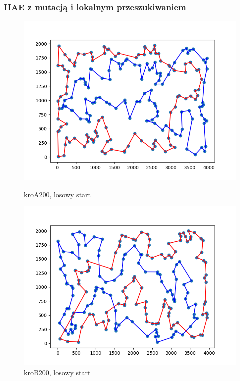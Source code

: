 \documentclass[11pt]{article}
\begin{document}
\subsubsection{HAE z mutacją i lokalnym przeszukiwaniem}

\begin{figure}[H]
    \begin{minipage}[t]{0.45\textwidth}
        \centering
        \includegraphics[width=\linewidth]{best_paths/kroA200/HAE+Mutation+LS}
        \caption{kroA200, losowy start}
    \end{minipage}
    \hfill
    \begin{minipage}[t]{0.45\textwidth}
        \centering
        \includegraphics[width=\linewidth]{best_paths/kroB200/HAE+Mutation+LS}
        \caption{kroB200, losowy start}
    \end{minipage}\label{fig:figure8}
\end{figure}
\end{document}
